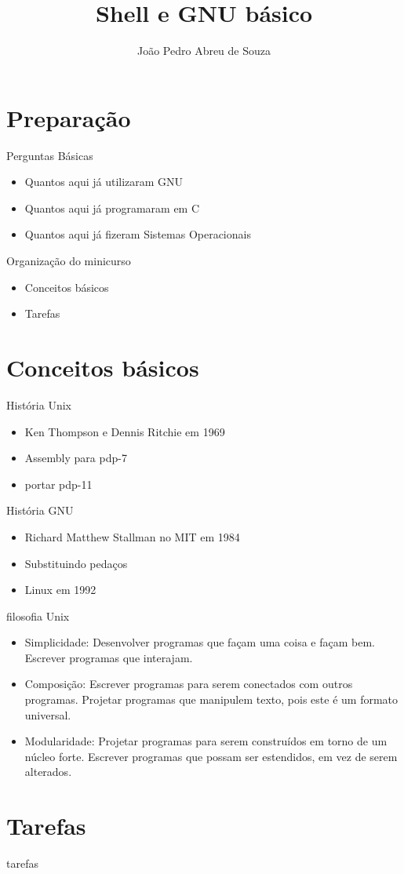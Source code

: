 \documentclass{beamer}
\title{Shell e GNU básico}
\author{João Pedro Abreu de Souza}
\begin{document}
\maketitle
\section{Preparação}
\begin{frame}{Perguntas Básicas}
	\begin{itemize}
		\item Quantos aqui já utilizaram GNU
		\pause
		\item Quantos aqui já programaram em C
		\pause
		\item Quantos aqui já fizeram Sistemas Operacionais
	\end{itemize}
\end{frame}
\begin{frame}{Organização do minicurso}
 \begin{itemize}
     \item Conceitos básicos
     \item Tarefas
 \end{itemize}
\end{frame}
\section{Conceitos básicos}
\begin{frame}{História Unix}
	\begin{itemize}
		\item Ken Thompson e Dennis Ritchie em 1969
		\item Assembly para pdp-7
		\item portar pdp-11
	\end{itemize}
\end{frame}
\begin{frame}{História GNU}
	\begin{itemize}
		\item Richard Matthew Stallman no MIT em 1984
		\item Substituindo pedaços
		\item Linux em 1992
	\end{itemize}
\end{frame}
\begin{frame}{filosofia Unix}
	\begin{itemize}
		\item Simplicidade: Desenvolver programas que façam uma coisa e façam bem. Escrever programas que interajam.
		\item Composição: Escrever programas para serem conectados com outros programas. Projetar programas que manipulem texto, pois este é um formato universal.
		\item Modularidade: Projetar programas para serem construídos em torno de um núcleo forte. Escrever programas que possam ser estendidos, em vez de serem alterados.
	\end{itemize}
\end{frame}
\section{Tarefas}
\begin{frame}{tarefas}
	
\end{frame}
\end{document}
